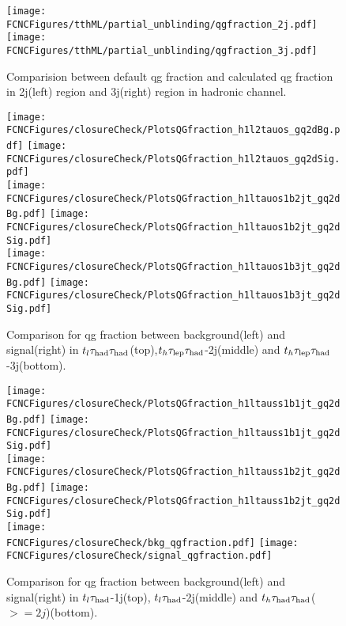 \begin{figure}[H]
\centering
\texttt{[image: \\FCNCFigures/tthML/partial\_unblinding/qgfraction\_2j.pdf]}
\texttt{[image: \\FCNCFigures/tthML/partial\_unblinding/qgfraction\_3j.pdf]}
\\
\caption{Comparision between default qg fraction and calculated qg fraction in 2j(left) region and 3j(right) region in hadronic channel.}
\label{fig:cal_and_defau_qg_frac}
\end{figure}



\begin{figure}[H]
\centering
\texttt{[image: \\FCNCFigures/closureCheck/PlotsQGfraction\_h1l2tauos\_gq2dBg.pdf]}
\texttt{[image: \\FCNCFigures/closureCheck/PlotsQGfraction\_h1l2tauos\_gq2dSig.pdf]}
\\
\texttt{[image: \\FCNCFigures/closureCheck/PlotsQGfraction\_h1ltauos1b2jt\_gq2dBg.pdf]}
\texttt{[image: \\FCNCFigures/closureCheck/PlotsQGfraction\_h1ltauos1b2jt\_gq2dSig.pdf]}
\\
\texttt{[image: \\FCNCFigures/closureCheck/PlotsQGfraction\_h1ltauos1b3jt\_gq2dBg.pdf]}
\texttt{[image: \\FCNCFigures/closureCheck/PlotsQGfraction\_h1ltauos1b3jt\_gq2dSig.pdf]}
\\
\caption{Comparison for qg fraction between background(left) and signal(right) in $t_l\tau_\text{had}{}\tau_\text{had}$(top),$t_h\tau_\text{lep}{}\tau_\text{had}$-2j(middle) and $t_h\tau_\text{lep}{}\tau_\text{had}$-3j(bottom).}
\label{fig:qg_frac_b_vs_s1}
\end{figure}

\begin{figure}[H]
\centering
\texttt{[image: \\FCNCFigures/closureCheck/PlotsQGfraction\_h1ltauss1b1jt\_gq2dBg.pdf]}
\texttt{[image: \\FCNCFigures/closureCheck/PlotsQGfraction\_h1ltauss1b1jt\_gq2dSig.pdf]}
\\
\texttt{[image: \\FCNCFigures/closureCheck/PlotsQGfraction\_h1ltauss1b2jt\_gq2dBg.pdf]}
\texttt{[image: \\FCNCFigures/closureCheck/PlotsQGfraction\_h1ltauss1b2jt\_gq2dSig.pdf]}
\\
\texttt{[image: \\FCNCFigures/closureCheck/bkg\_qgfraction.pdf]}
\texttt{[image: \\FCNCFigures/closureCheck/signal\_qgfraction.pdf]}
\caption{Comparison for qg fraction between background(left) and signal(right) in $t_l\tau_\text{had}$-1j(top), $t_l\tau_\text{had}$-2j(middle) and $t_h\tau_\text{had}{}\tau_\text{had}$($>=2j$)(bottom).}
\label{fig:qg_frac_b_vs_s2}
\end{figure}


